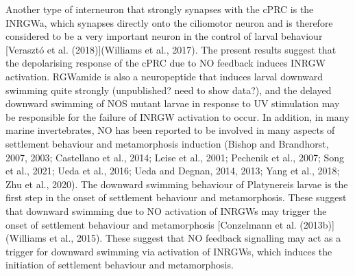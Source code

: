 \documentclass[
  10pt,
  onecolumn]{article}
\begin{document}
Another type of interneuron that strongly synapses with the cPRC is the
INRGWa, which synapses directly onto the ciliomotor neuron and is
therefore considered to be a very important neuron in the control of
larval behaviour {[}Verasztó et al. (2018){]}(Williams et al., 2017).
The present results suggest that the depolarising response of the cPRC
due to NO feedback induces INRGW activation. RGWamide is also a
neuropeptide that induces larval downward swimming quite strongly
(unpublished? need to show data?), and the delayed downward swimming of
NOS mutant larvae in response to UV stimulation may be responsible for
the failure of INRGW activation to occur. In addition, in many marine
invertebrates, NO has been reported to be involved in many aspects of
settlement behaviour and metamorphosis induction (Bishop and Brandhorst,
2007, 2003; Castellano et al., 2014; Leise et al., 2001; Pechenik et
al., 2007; Song et al., 2021; Ueda et al., 2016; Ueda and Degnan, 2014,
2013; Yang et al., 2018; Zhu et al., 2020). The downward swimming
behaviour of Platynereis larvae is the first step in the onset of
settlement behaviour and metamorphosis. These suggest that downward
swimming due to NO activation of INRGWs may trigger the onset of
settlement behaviour and metamorphosis {[}Conzelmann et al.
(2013b){]}(Williams et al., 2015). These suggest that NO feedback
signalling may act as a trigger for downward swimming via activation of
INRGWs, which induces the initiation of settlement behaviour and
metamorphosis.
\end{document}
